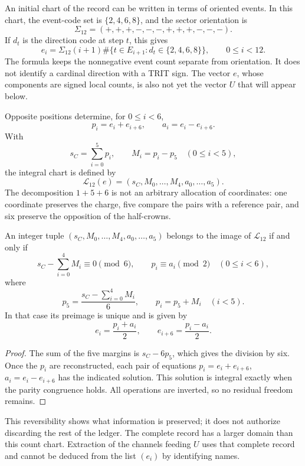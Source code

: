An initial chart of the record can be written in terms of oriented
events. In this chart, the event-code set is
\(\{2,4,6,8\}\), and the sector orientation is
\[
 \Sigma_{12}=(+,+,+,-,-,-,+,+,+,-,-,-).
\]
If \(d_t\) is the direction code at step \(t\), this gives
\[
 e_i=\Sigma_{12}(i+1)
 \#\{t\in E_{i+1}:d_t\in\{2,4,6,8\}\},
 \qquad0\leq i<12.
\]
The formula keeps the nonnegative event count separate from
orientation. It does not identify a cardinal direction with a TRIT sign. The
vector \(e\), whose components are signed local counts, is also not
yet the vector \(U\) that will appear below.

Opposite positions determine, for \(0\leq i<6\),
\[
 p_i=e_i+e_{i+6},\qquad a_i=e_i-e_{i+6}.
\]
With
\[
 s_C=\sum_{i=0}^{5}p_i,\qquad M_i=p_i-p_5\quad(0\leq i<5),
\]
the integral chart is defined by
\[
 \mathcal L_{12}(e)
 =(s_C,M_0,\ldots,M_4,a_0,\ldots,a_5).
\]
The decomposition \(1+5+6\) is not an arbitrary allocation of coordinates:
one coordinate preserves the charge, five compare the pairs with a
reference pair, and six preserve the opposition of the half-crowns.

\begin{lemma}
\label{lem:k-carta-integral}
An integer tuple \((s_C,M_0,\ldots,M_4,a_0,\ldots,a_5)\) belongs to the
image of \(\mathcal L_{12}\) if and only if
\[
 s_C-\sum_{i=0}^{4}M_i\equiv0\pmod6,
 \qquad p_i\equiv a_i\pmod2\quad(0\leq i<6),
\]
where
\[
 p_5=\frac{s_C-\sum_{i=0}^{4}M_i}{6},\qquad p_i=p_5+M_i\quad(i<5).
\]
In that case its preimage is unique and is given by
\[
 e_i=\frac{p_i+a_i}{2},\qquad e_{i+6}=\frac{p_i-a_i}{2}.
\]
\end{lemma}

\begin{proof}
The sum of the five margins is \(s_C-6p_5\), which gives the
division by six. Once the \(p_i\) are reconstructed, each pair of equations
\(p_i=e_i+e_{i+6}\), \(a_i=e_i-e_{i+6}\) has the indicated solution.
This solution is integral exactly when the parity congruence holds. All
operations are inverted, so no residual freedom remains.
\end{proof}

This reversibility shows what information is preserved; it does not authorize
discarding the rest of the ledger. The complete record has a larger domain
than this count chart. Extraction of the channels feeding
\(U\) uses that complete record and cannot be deduced from the list
\((e_i)\) by identifying names.




